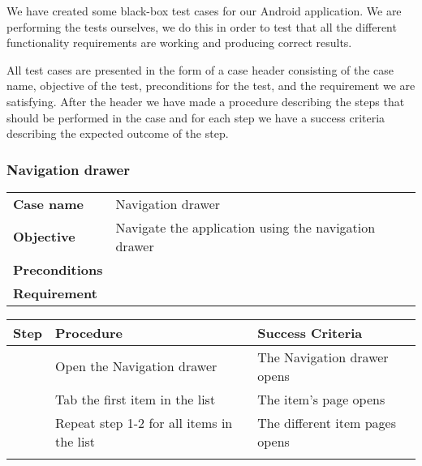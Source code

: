 We have created some black-box test cases for our Android application. We are performing the tests ourselves, we do this in order to test that all the different functionality requirements are working and producing correct results.

All test cases are presented in the form of a case header consisting of the case name, objective of the test, preconditions for the test, and the requirement we are satisfying. After the header we have made a procedure describing the steps that should be performed in the case and for each step we have a success criteria describing the expected outcome of the step.

\newcommand{\testcase}[4]
{
\subsubsection*{#1}
\begin{center}
\begin{tabular}{p{2.6cm} p{10cm}}
\hline
\textbf{Case name} & #1\\
\textbf{Objective} & #2\\
\textbf{Preconditions} & #3\\
\textbf{Requirement} & #4\\
\hline
\end{tabular}
\end{center}
}

\newenvironment{testprocedure}%
{\newcommand{\step}{\arabic{counter}\stepcounter{counter}}
\setcounter{counter}{1}
\begin{center}
\begin{tabular}{| c | p{5.4cm} | p{5.4cm} |}
\hline
\textbf{Step} & \textbf{Procedure} & \textbf{Success Criteria}\\
\hline}
{\hline
\multicolumn{3}{c}{} \\%
\end{tabular}
\end{center}}

\testcase
{Navigation drawer}
{Navigate the application using the navigation drawer}
{}
{}

\begin{testprocedure}
\step & Open the Navigation drawer & The Navigation drawer opens\\
\hline
\step & Tab the first item in the list & The item's page opens\\
\hline
\step & Repeat step 1-2 for all items in the list & The different item pages opens \\
\end{testprocedure}

